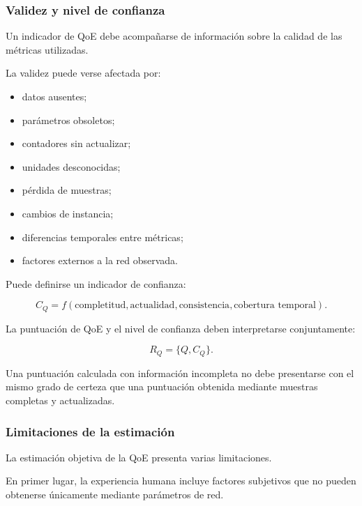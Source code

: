 \subsubsection*{Validez y nivel de confianza}

Un indicador de QoE debe acompañarse de información sobre la calidad de
las métricas utilizadas.

La validez puede verse afectada por:

\begin{itemize}
    \item datos ausentes;

    \item parámetros obsoletos;

    \item contadores sin actualizar;

    \item unidades desconocidas;

    \item pérdida de muestras;

    \item cambios de instancia;

    \item diferencias temporales entre métricas;

    \item factores externos a la red observada.
\end{itemize}

Puede definirse un indicador de confianza:

\[
    C_Q
    =
    f
    \left(
        \text{completitud},
        \text{actualidad},
        \text{consistencia},
        \text{cobertura temporal}
    \right).
\]

La puntuación de QoE y el nivel de confianza deben interpretarse
conjuntamente:

\[
    R_Q
    =
    \{
        Q,
        C_Q
    \}.
\]

Una puntuación calculada con información incompleta no debe presentarse
con el mismo grado de certeza que una puntuación obtenida mediante
muestras completas y actualizadas.


\subsubsection*{Limitaciones de la estimación}

La estimación objetiva de la QoE presenta varias limitaciones.

En primer lugar, la experiencia humana incluye factores subjetivos que no
pueden obtenerse únicamente mediante parámetros de red.

